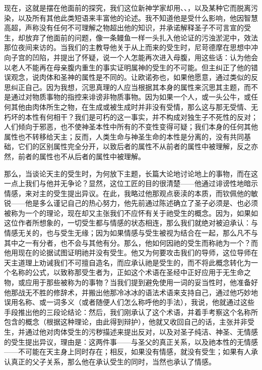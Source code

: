 现在，这就是摆在他面前的探究，我们这位新神学家却用、、，以及某种它而脱离污染，以及所有其他此类短语来丰富他的论述。我不知道他是受什么影响，他因智慧高超，声称没有任何不可理解之物超出他的知识，并承诺解释圣子不可言宣的受生，却放弃了他面前的问题，像一条鳗鱼一样一头扎入他论证的污浊淤泥中，效法那位夜间来访的。当我们的主教导他关于从上而来的受生时，尼苛德摩在思想中冲向子宫的凹陷，并提出了怀疑，说一个人怎能再次进入母腹，用这些话：认为他会以老人不能再在母亲腹内重生的事实证明属神的受生的不可能。但主纠正了他的错误观念，说肉体和圣神的属性是不同的。让欧诺弥也，如果他愿意，通过类似的反思纠正自己。因为我想，沉思真理的人应当根据其本身的属性来沉思其主题，而不是通过对物质事物的指控来诽谤非物质事物。因为如果一个人，或一头公牛，或任何其他由肉体所生之物，在生成或被生成时并非没有受情，那么这与那无受情、无朽坏的本性有何相干？我们是可朽的这一事实，并不构成对独生子不死性的反对；人们倾向于邪恶，也不使神圣本性中所有的不变性变得可疑；我们本身的任何其他属性也不转移给天主；反而，人类生命与神圣生命的本性是分离的，没有共同基础，它们的区别属性完全分开，以致后者的属性不从前者的属性中被理解，反之亦然，前者的属性也不从后者的属性中被理解。\par

那么，当谈论天主的受生时，为何放下主题，长篇大论地讨论地上的事物，而在这一点上我们与他并无争论？显然，这位工匠的目的很清楚——他通过诽谤性地暗示情感，来对主的受生提出异议。在此，我略过他那观点亵渎的本质，而钦佩他的敏锐——他是多么谨记自己的热心努力，他先前通过陈述确立了圣子必须是、也必须被称为一个的理论，现在却又主张我们不应怀有关于祂受生的概念。因为，如果如这位作者所想象的，一切受生都与情感的状态相连，那么我们就绝对被迫承认：与情感无关的，也与受生无缘；因为如果情感与受生被视为结合在一起，那么凡不与其中之一有分者，也不会与其他有分。那么，他如何因祂的受生而称祂为一个？而他用现在的论据试图证明祂并没有受生。他又为何要攻击我们的导师，这位导师在天主道理上劝诫我们不可擅自造名，而应承认祂是受生的，而不将此概念转化为一个名称的公式，以致称那受生者为，正如这个术语在圣经中正好应用于无生命之物，或应用于那些被称为的事物？当我们提到避免使用一词的妥当性时，他准备好他那战无不胜的修辞术，并搬出他那冷冰冰的语法术语来支持自己，通过他巧妙地误用名称、或一词多义（或者随便人们怎么称呼他的手法），我说，他就通过这些手段推出他的三段论结论：然后，我们刚承认了这个术语，并着手考察这个名称所包含的概念（根据这种理论，由此得到辩护），他就又收回自己的话，主张并非受生，并通过他对肉体受生的污秽描述来提出反对，以及对圣子纯洁、神圣、无情感的受生提出异议，理由是：这两件事——与圣父的真正关系，以及祂本性的无情感——不可能在天主身上同时存在；相反，如果没有情感，就没有受生；如果有人承认真正的父子关系，那么他在承认受生的同时，当然也承认了情感。\par

